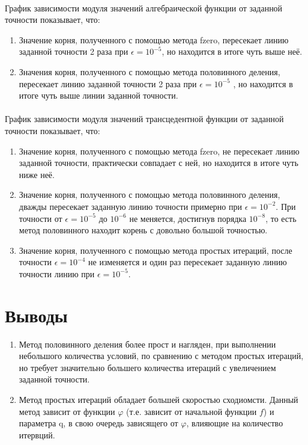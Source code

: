 \documentclass{article}
\begin{document}
	\paragraph{}График зависимости модуля значений алгебраической функции от заданной точности показывает, что:
	\begin{enumerate}
		\item Значение корня, полученного с помощью метода fzero, пересекает линию заданной точности 2 раза при $\epsilon=10^{-5}$, но находится в итоге чуть выше неё.
		\item Значения корня, полученного с помощью метода половинного деления, пересекает линию заданной точности 2 раза при $\epsilon=10^{-5}$ , но находится в итоге чуть выше линии заданной точности.
		
	\end{enumerate}
	\paragraph{}График зависимости модуля значений трансцедентной функции от заданной точности показывает, что:
	\begin{enumerate}
		\item Значение корня, полученного с помощью метода fzero, не пересекает линию заданной точности, практически совпадает с ней, но находится в итоге чуть ниже неё.
		\item Значение корня, полученного с помощью метода половинного деления, дважды пересекает заданную линию точности примерно при $\epsilon=10^{-2}$. При точности от $\epsilon=10^{-5}$ до $ 10^{-6}$  не меняется, достигнув порядка $10^{-8}$, то есть
		метод половинного находит корень с довольно большой
		точностью.
		\item Значение корня, полученного с помощью метода простых итераций, после точности $\epsilon=10^{-4}$ не изменяется и один раз пересекает заданную линию точности линию при $\epsilon=10^{-5}$.
	\end{enumerate}
	\section{Выводы}
	\begin{enumerate}
		\item Метод половинного деления более прост и нагляден, при выполнении небольшого количества условий, по сравнению с методом простых итераций, но требует значительно большего количества итераций с увеличением заданной точности.
		\item Метод простых итераций обладает большей скоростью сходиомсти. Данный метод зависит от функции $\varphi$ (т.е. зависит от начальной функции $f$) и параметра q, в свою очередь зависящего от $\varphi$, влияющие на количество итервций. 
	\end{enumerate}
	
\end{document}
